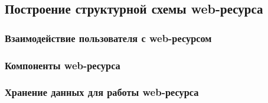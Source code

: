     \subsection{Построение структурной схемы web-ресурса}
        \subsubsection{Взаимодействие пользователя с web-ресурсом}

        \subsubsection{Компоненты web-ресурса}

        \subsubsection{Хранение данных для работы web-ресурса}


\clearpage

